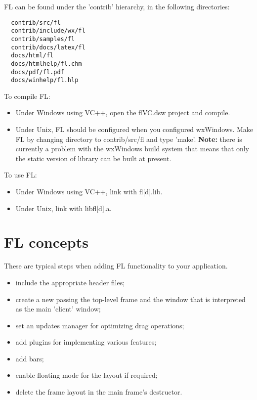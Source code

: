 FL can be found under the 'contrib' hierarchy, in the following directories:

\begin{verbatim}
  contrib/src/fl
  contrib/include/wx/fl
  contrib/samples/fl
  contrib/docs/latex/fl
  docs/html/fl
  docs/htmlhelp/fl.chm
  docs/pdf/fl.pdf
  docs/winhelp/fl.hlp
\end{verbatim}

To compile FL:

\begin{itemize}\itemsep=0pt
\item Under Windows using VC++, open the flVC.dsw project
and compile.
\item Under Unix, FL should be configured when you configured
wxWindows. Make FL by changing directory to contrib/src/fl and
type 'make'. {\bf Note:} there is currently a
problem with the wxWindows build system that means that
only the static version of library can be built at present.
\end{itemize}

To use FL:

\begin{itemize}\itemsep=0pt
\item Under Windows using VC++, link with fl[d].lib.
\item Under Unix, link with libfl[d].a.
\end{itemize}

\section{FL concepts}

These are typical steps when adding FL functionality to your application.

\begin{itemize}\itemsep=0pt
\item include the appropriate header files;
\item create a new  passing the top-level frame and the window that
is interpreted as the main 'client' window;
\item set an updates manager for optimizing drag operations;
\item add plugins for implementing various features;
\item add bars;
\item enable floating mode for the layout if required;
\item delete the frame layout in the main frame's destructor.
\end{itemize}


